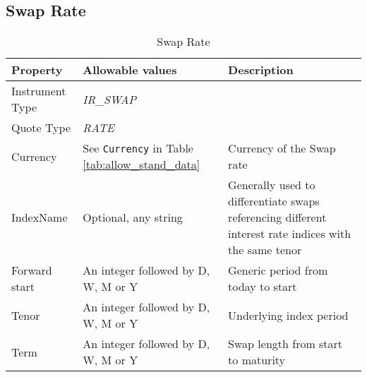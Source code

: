 


\subsection{Swap Rate}

\begin{table}[H]
\centering
  \begin{tabular}{|p{3cm}|p{3.5cm}|p{7cm}|}
    \hline
    {\bf Property} & {\bf Allowable values} & {\bf Description} \\ \hline
    Instrument Type & \emph{IR\_SWAP} & \\ \hline
    Quote Type & \emph{RATE} & \\ \hline
    Currency & See \lstinline!Currency! in Table \ref{tab:allow_stand_data} & Currency of the Swap rate\\ \hline
    IndexName & Optional, any string & Generally used to differentiate swaps referencing different interest rate indices with the same tenor\\ \hline
    Forward start & An integer followed by D, W, M or Y & Generic period from today to start\\ \hline
    Tenor & An integer followed by D, W, M or Y & Underlying index period \\ \hline
    Term & An integer followed by D, W, M or Y & Swap length from start to maturity\\ \hline
  \end{tabular}
  \caption{Swap Rate}
  \label{tab:swaprate_quote}
\end{table}

